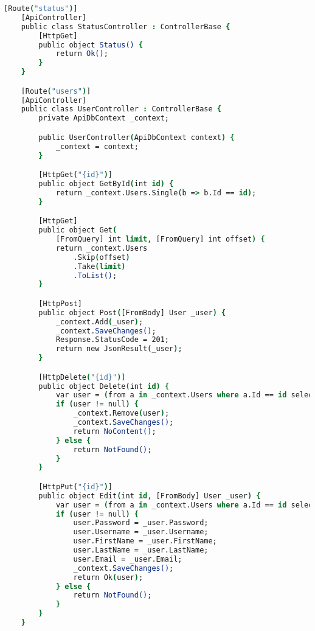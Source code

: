 \begin{lstlisting}[language=csh,caption={ASP.NET Core routing and endpoint logic},breaklines=true,label={lst:aspnetEndpoints}]
    [Route("status")]
    [ApiController]
    public class StatusController : ControllerBase {
        [HttpGet]
        public object Status() {
            return Ok();
        }
    }

    [Route("users")]
    [ApiController]
    public class UserController : ControllerBase {
        private ApiDbContext _context;

        public UserController(ApiDbContext context) {
            _context = context;
        }

        [HttpGet("{id}")]
        public object GetById(int id) {
            return _context.Users.Single(b => b.Id == id);
        }

        [HttpGet]
        public object Get(
            [FromQuery] int limit, [FromQuery] int offset) {
            return _context.Users
                .Skip(offset)
                .Take(limit)
                .ToList();
        }

        [HttpPost]
        public object Post([FromBody] User _user) {
            _context.Add(_user);
            _context.SaveChanges();
            Response.StatusCode = 201;
            return new JsonResult(_user);
        }

        [HttpDelete("{id}")]
        public object Delete(int id) {
            var user = (from a in _context.Users where a.Id == id select a).FirstOrDefault();
            if (user != null) {
                _context.Remove(user);
                _context.SaveChanges();
                return NoContent();
            } else {
                return NotFound();
            }
        }

        [HttpPut("{id}")]
        public object Edit(int id, [FromBody] User _user) {
            var user = (from a in _context.Users where a.Id == id select a).FirstOrDefault();
            if (user != null) {
                user.Password = _user.Password;
                user.Username = _user.Username;
                user.FirstName = _user.FirstName;
                user.LastName = _user.LastName;
                user.Email = _user.Email;
                _context.SaveChanges();
                return Ok(user);
            } else {
                return NotFound();
            }
        }
    }
\end{lstlisting}
